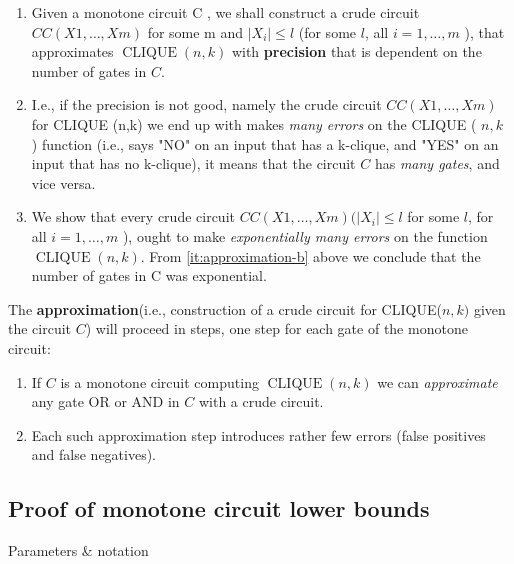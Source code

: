 \begin{enumerate}
    
\item  Given a monotone circuit C , we shall construct a crude circuit ${CC}({X} 1, \ldots, {Xm})$ for some m and $\left|{X}_{{i}}\right| \leq l$ (for some $l$, all ${i}=1, \ldots, {m}$ ), that approximates $\operatorname{CLIQUE}({n}, {k})$ with \textbf{precision} that is dependent on the number of gates in $C$.

\item I.e., if the precision is not good, namely the crude circuit ${CC}({X} 1, \ldots, {Xm})$ for CLIQUE (n,k) we end up with makes \textit{many errors} on the CLIQUE ( $n, k$ ) function (i.e., says "NO" on an input that has a k-clique, and "YES" on an input that has no k-clique), it means that the circuit $C$ has \textit{many gates}, and vice versa.\label{it:approximation-b}

\item We show that every crude circuit ${CC}({X} 1, \ldots, {Xm})(|{X}_i| \leq l$ for some $l$, for all $i=1, \ldots, m$ ), ought to make \textit{exponentially many errors} on the function $\operatorname{CLIQUE}(n, k)$. From \ref{it:approximation-b} above we conclude that the number of gates in C was exponential.

\end{enumerate}


The \textbf{approximation}(i.e., construction of a crude circuit for CLIQUE(${n},{k})$ given the circuit $C$) will proceed in steps, one step for each gate of the monotone circuit:

\begin{enumerate}
    
\item If $C$ is a monotone circuit computing $\operatorname{CLIQUE}({n}, {k})$ we can \textit{approximate} any gate OR or AND in $C$ with a crude circuit.

\item Each such approximation step introduces rather few errors (false positives and false negatives).
\end{enumerate}


\subsection{Proof of monotone circuit lower bounds}

Parameters \& notation



